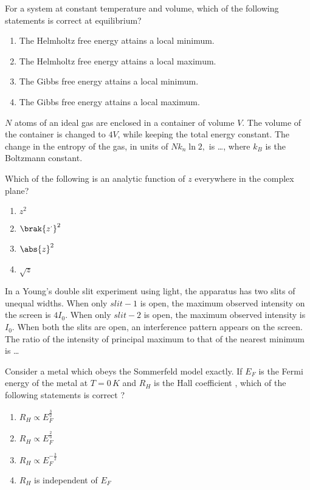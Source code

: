     \item For a system at constant temperature and volume, which of the following statements is correct at equilibrium?
    \begin{enumerate}
        \item The Helmholtz free energy attains a local minimum.
        \item The Helmholtz free energy attains a local maximum.
        \item The Gibbs free energy attains a local minimum.
        \item The Gibbs free energy attains a local maximum.
    \end{enumerate}
    \item $N$ atoms of an ideal gas are enclosed in a container of volume $V$. The volume of the container is changed to $4V$, while keeping the total energy constant. The change in the entropy of the gas, in units of $Nk_n\ln 2,$ is \dots, where $k_B$ is the Boltzmann constant.
    \item Which of the following is an analytic function of $z$ everywhere in the complex plane?
    \begin{enumerate}
        \item $z^2$
        \item $\brak{z^{\cdot}}^2$
        \item $\abs{z}^2$
        \item $\sqrt{z}$
    \end{enumerate}
    \item In a Young's double slit experiment using light, the apparatus has two slits of unequal widths. When only $slit-1$ is open, the maximum observed intensity on the screen is $4I_0$. When only $slit-2$ is open, the maximum observed intensity is $I_0$. When both the slits are open, an interference pattern appears on the screen. The ratio of the intensity of principal maximum to that of the nearest minimum is \dots
    \item Consider a metal which obeys the Sommerfeld model exactly. If $E_F$ is the Fermi energy of the metal at $T=0\,K$ and $R_H$ is the Hall coefficient , which of the following statements is correct ?
    \begin{enumerate}
        \item $R_H\propto E_F^{\frac{3}{2}}$
        \item $R_H\propto E_F^{\frac{2}{3}}$
        \item $R_H\propto E_F^{-\frac{3}{2}}$
        \item $R_H$ is independent of $E_F$
    \end{enumerate}
